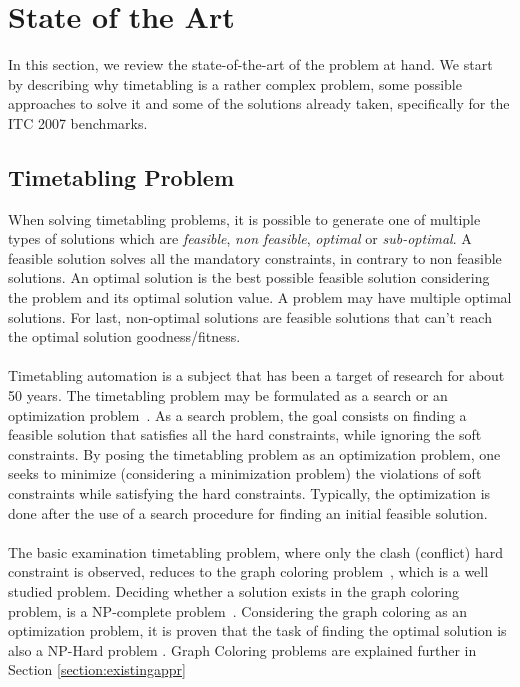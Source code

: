\chapter{State of the Art}
\label{stateofart}
\thispagestyle{plain}

In this section, we review the state-of-the-art of the problem at hand. We start by describing why timetabling is a rather complex problem, some possible approaches to solve it and some of the solutions already taken, specifically for the ITC 2007 benchmarks.\\

\section{Timetabling Problem}

When solving timetabling problems, it is possible to generate one of multiple types of solutions which are \textit{feasible}, \textit{non feasible}, \textit{optimal} or \textit{sub-optimal}. A feasible solution solves all the mandatory constraints, in contrary to non feasible solutions. An optimal solution is the best possible feasible solution considering the problem and its optimal solution value. A problem may have multiple optimal solutions. For last, non-optimal solutions are feasible solutions that can't reach the optimal solution goodness/fitness.\\
\\
Timetabling automation is a subject that has been a target of research for about 50 years. The timetabling problem may be formulated as a search or an optimization problem~\cite{Schaerf1999}. As a search problem, the goal consists on finding a feasible solution that satisfies all the hard constraints, while ignoring the soft constraints. By posing the timetabling problem as an optimization problem, one seeks to minimize (considering a minimization problem) the violations of soft constraints while satisfying the hard constraints. Typically, the optimization is done after the use of a search procedure for finding an initial feasible solution.\\
\\
The basic examination timetabling problem, where only the clash (conflict) hard constraint is observed, reduces to the graph coloring problem~\cite{Jensen2001}, which is a well studied problem. Deciding whether a solution exists in the graph coloring problem, is a NP-complete problem~\cite{Arora2009}. Considering the graph coloring as an optimization problem, it is proven that the task of finding the optimal solution is also a NP-Hard problem \cite{Arora2009}. Graph Coloring problems are explained further in Section \ref{section:existingappr}
\\
